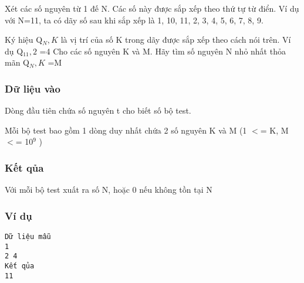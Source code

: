 

Xét các số nguyên từ 1 đế N. Các số này được sắp xếp theo thứ tự từ điển. Ví dụ với N=11, ta có dãy số sau khi sắp xếp là 1, 10, 11, 2, 3, 4, 5, 6, 7, 8, 9.

Ký hiệu Q$_N,K $ là vị trí của số K trong dãy được sắp xếp theo cách nói trên. Ví dụ Q$_11,2 $ =4 Cho các số nguyên K và M. Hãy tìm số nguyên N nhỏ nhất thỏa mãn Q$_N,K $ =M

\subsubsection{Dữ liệu vào}

Dòng đầu tiên chứa số nguyên t cho biết số bộ test.

Mỗi bộ test bao gồm 1 dòng duy nhất chứa 2 số nguyên K và M (1 $<$= K, M $<$= 10$^9 $ )

\subsubsection{Kết qủa}

Với mỗi bộ test xuất ra số N, hoặc 0 nếu không tồn tại N

\subsubsection{Ví dụ}
\begin{verbatim}
Dữ liệu mẫu
1
2 4
Kết qủa
11
\end{verbatim}